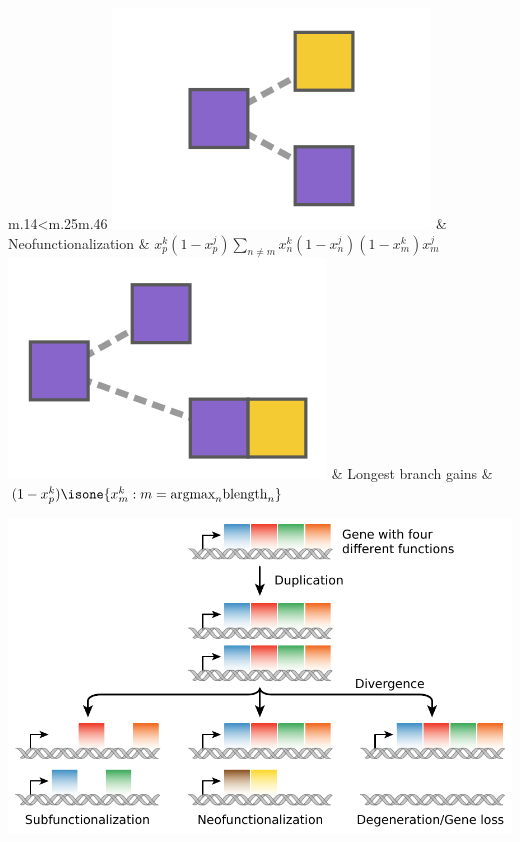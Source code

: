 \documentclass[10pt,aspectratio=169]{beamer}
\newcounter{frame}[frame]
\begin{document}
\begin{frame}
\begin{minipage}[t]{.95\linewidth}
\begin{table}
\begin{tabular}{m{.14\linewidth}<\centering m{.25\linewidth}m{.46\linewidth}}
	\includegraphics[width=\fwidth]{fig/term-neofun.png} & %
		Neofunctionalization & $x_p^k(1 - x_p^j)\sum_{n\neq m}x_n^k(1-x_n^j)(1-x_m^k)x_m^j$ \\
	\includegraphics[width=\fwidth]{fig/term-longest.png} & %
		Longest branch gains & $(1-x_p^k)\isone{x_m^k : m=\text{argmax}_n\text{blength}_n}$ \\
	\bottomrule
	\end{tabular}
	\caption{Example of sufficient statistics for evolutionary transitions.}
	\end{table}
 \normalsize
 \end{minipage}
 \begin{minipage}[t]{.04\linewidth}\hspace{-3cm}
    \includegraphics[width=6\linewidth]{fig/Evolution_fate_duplicate_genes_-_vector.pdf}\vspace{-3cm}
\end{minipage}
\end{frame}
\end{document}
